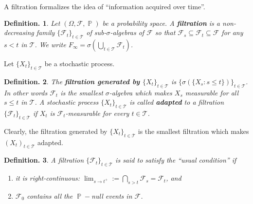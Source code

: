 \documentclass[11pt, a4paper]{memoir}
\theoremstyle{change}
\newtheorem{theorem}{Theorem.}[section]
\theoremstyle{plain}
\theoremstyle{nonumberplain}
\newtheorem{definition}{Definition.}
\newtheorem{proof}{Proof}
\DeclareMathOperator{\pr}{{\mathbb{P}}}
\newcommand{\defn}[1]{{\boldmath\bfseries #1}}
\numberwithin{equation}{section}
\begin{document}
A filtration formalizes the idea of ``information acquired over time''.
\begin{definition}
    Let $(\Omega,\mathcal{F},\pr)$ be a probability space.
    A \defn{filtration} is a non-decreasing family $\{\mathcal{F}_t\}_{t\in \mathcal{T}}$ of sub-$\sigma$-algebras of $\mathcal{F}$ so that $\mathcal{F}_s\subseteq\mathcal{F}_t\subseteq\mathcal{F}$ for any $s<t$ in $\mathcal{T}$.
    We write $F_\infty=\sigma(\bigcup_{t\in \mathcal{T}}\mathcal{F}_t)$.
\end{definition}
Let $\{X_t\}_{t\in \mathcal{T}}$ be a stochastic process.
\begin{definition}
    The \defn{filtration generated by $\{X_t\}_{t\in \mathcal{T}}$} is $\{\sigma(\{X_s:s\leq t\})\}_{t\in \mathcal{T}}$.
    In other words $\mathcal{F}_t$ is the smallest $\sigma$-algebra which makes $X_s$ measurable for all $s\leq t$ in $\mathcal{T}$.
    A stochastic process $\{X_t\}_{t\in \mathcal{T}}$ is called \defn{adapted} to a filtration $\{\mathcal{F}_t\}_{t\in \mathcal{T}}$ if $X_t$ is $\mathcal{F}_t$-measurable for every $t\in \mathcal{T}$.
\end{definition}
Clearly, the filtration generated by $\{X_t\}_{t\in \mathcal{T}}$ is the smallest filtration which makes $(X_t)_{t\in \mathcal{T}}$ adapted.
\begin{definition}
    A filtration $\{\mathcal{F}_t\}_{t\in \mathcal{T}}$ is said to satisfy the ``usual condition'' if
    \begin{enumerate}[nl,r]
        \item it is right-continuous: $\lim_{s\to t^+}:=\bigcap_{s>t}\mathcal{F}_s=\mathcal{F}_t$, and
        \item $\mathcal{F}_0$ contains all the $\pr-$null events in $\mathcal{F}$.
    \end{enumerate}
\end{definition}
\end{document}
